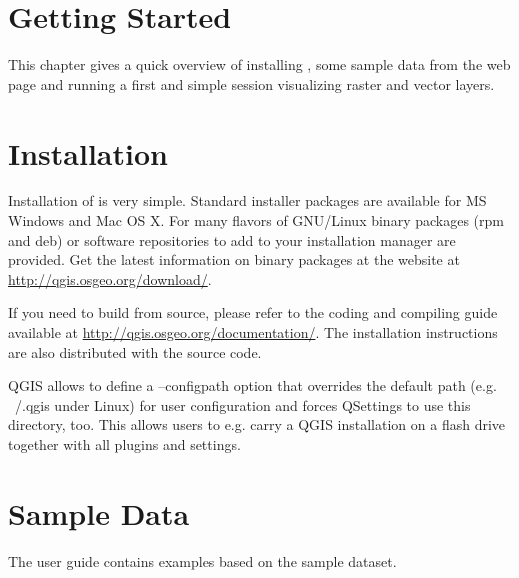 
\section{Getting Started}\label{label_getstarted}


This chapter gives a quick overview of installing \qg, some sample 
data from the \qg web page and running a first and simple session 
visualizing raster and vector layers.

\section{Installation}\label{label_installation}

Installation of \qg is very simple. Standard installer packages are
available for MS Windows and Mac OS X. For many flavors of GNU/Linux binary
packages (rpm and deb) or software repositories to add to your installation
manager are provided. Get the latest information on binary packages at the
\qg website at \url{http://qgis.osgeo.org/download/}.


If you need to build \qg from source, please refer to the coding and
compiling guide available at \url{http://qgis.osgeo.org/documentation/}. 
The installation instructions are also distributed with the \qg source
code.


QGIS allows to define a --configpath option that overrides the default path 
(e.g. ~/.qgis under Linux) for user configuration and forces QSettings to use 
this directory, too. This allows users to e.g. carry a QGIS installation on a 
flash drive together with all plugins and settings. 

\section{Sample Data}\label{label_sampledata}

The user guide contains examples based on the \qg sample dataset. 

